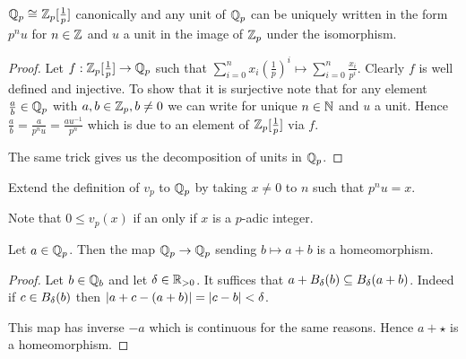 \begin{prop}
    $\mathbb{Q}_p \cong_{} \mathbb{Z}_p[\frac{1}{p}]$ canonically and any unit of $\mathbb{Q}_p$
    can be uniquely written in the form $p^n u$ for $n \in \mathbb{Z}$
    and $u$ a unit in the image of $\mathbb{Z}_p$ under the isomorphism. 
\end{prop}
\begin{proof}
    Let $f : \mathbb{Z}_p [\frac{1}{p}] \to \mathbb{Q}_p$ such that 
    $\sum_{i = 0}^{n} x_i (\frac{1}{p})^i
    \mapsto \sum_{i = 0}^{n} \frac{x_i}{p^i}$.
    Clearly $f$ is well defined and injective.
    To show that it is surjective note that for any element
    $\frac{a}{b} \in \mathbb{Q}_p$ with $a, b \in \mathbb{Z}_p, b \ne 0$
    we can write  
    for unique $n \in \mathbb{N}$ and $u$ a unit.
    Hence 
    $\frac{a}{b} = \frac{a}{p^n u} = \frac{a u^{-1}}{p^n}$
    which is due to an element of $\mathbb{Z}_p[\frac{1}{p}]$ via $f$.

    The same trick gives us the decomposition of units in $\mathbb{Q}_p$.
\end{proof}

\begin{dfn}
    Extend the definition of $v_p$ to $\mathbb{Q}_p$
    by taking $x \ne 0$ to $n$ such that $p^n u = x$.

    Note that $0 \le v_p(x)$ if an only if 
    $x$ is a $p$-adic integer.
\end{dfn}

\begin{dfn}
    Let $a \in \mathbb{Q}_p$.
    Then the map $\mathbb{Q}_p \to \mathbb{Q}_p$ sending 
    $b \mapsto a + b$ is a homeomorphism.
\end{dfn}
\begin{proof}
    Let $b \in \mathbb{Q}_b$ and let $\delta \in \mathbb{R}_{>0}$.
    It suffices that $a + B_\delta (b) \subseteq B_\delta (a + b)$.
    Indeed if $c \in B_\delta (b)$ then
    $\left\vert a + c - (a + b) \right\vert = \left\vert c - b \right\vert < \delta$.

    This map has inverse $-a$ which is continuous for the 
    same reasons. 
    Hence $a+\star$ is a homeomorphism.
\end{proof}

